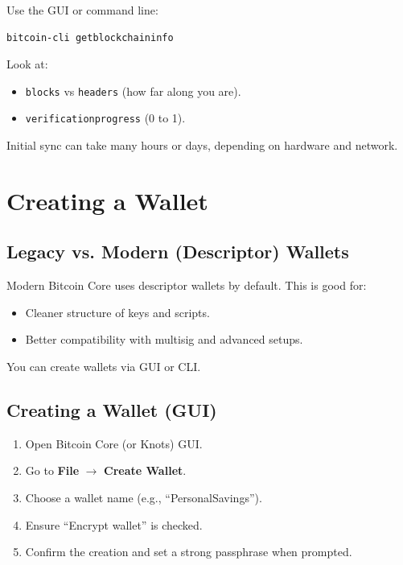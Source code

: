 \documentclass[12pt,a4paper]{book}
\begin{document}
Use the GUI or command line:

\begin{lstlisting}[style=bashstyle]
bitcoin-cli getblockchaininfo
\end{lstlisting}

Look at:

\begin{itemize}
  \item \texttt{blocks} vs \texttt{headers} (how far along you are).
  \item \texttt{verificationprogress} (0 to 1).
\end{itemize}

Initial sync can take many hours or days, depending on hardware and network.

\chapter{Creating a Wallet}

\section{Legacy vs. Modern (Descriptor) Wallets}

Modern Bitcoin Core uses descriptor wallets by default. This is good for:

\begin{itemize}
  \item Cleaner structure of keys and scripts.
  \item Better compatibility with multisig and advanced setups.
\end{itemize}

You can create wallets via GUI or CLI.

\section{Creating a Wallet (GUI)}

\begin{enumerate}
  \item Open Bitcoin Core (or Knots) GUI.
  \item Go to \textbf{File} $\rightarrow$ \textbf{Create Wallet}.
  \item Choose a wallet name (e.g., \enquote{PersonalSavings}).
  \item Ensure \enquote{Encrypt wallet} is checked.
  \item Confirm the creation and set a strong passphrase when prompted.
\end{enumerate}
\end{document}
